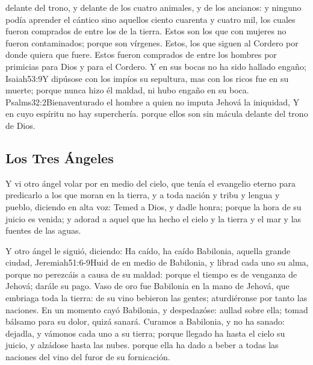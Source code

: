  delante del trono, y delante de los cuatro animales, y de los ancianos: y ninguno podía aprender el cántico sino aquellos ciento cuarenta y cuatro mil, los cuales fueron comprados de entre los de la tierra. 
Estos son los que con mujeres no fueron contaminados; porque son vírgenes. Estos, los que siguen al Cordero por donde quiera que fuere. Estos fueron comprados de entre los hombres por primicias para Dios y para el Cordero. 
Y en sus bocas no ha sido hallado engaño;%
				   {Isaiah}{53:9}{Y dipúsose con los impíos su sepultura, mas con los ricos fue en su muerte; porque nunca hizo él maldad, ni hubo engaño en su boca.}%
				   {Psalms}{32:2}{Bienaventurado el hombre a quien no imputa Jehová la iniquidad, Y en cuyo espíritu no hay superchería.}
 porque ellos son sin mácula delante del trono de Dios.
\subsection*{Los Tres Ángeles}
Y vi otro ángel volar por en medio del cielo, que tenía el evangelio eterno para predicarlo a los que moran en la tierra, y a toda nación y tribu y lengua y pueblo, 
diciendo en alta voz: Temed a Dios, y dadle honra; porque la hora de su juicio es venida; y adorad a aquel que ha hecho el cielo y la tierra y el mar y las fuentes de las aguas.

Y otro ángel le siguió, diciendo: Ha caído, ha caído Babilonia, aquella grande ciudad,%
				  {Jeremiah}{51:6-9}{Huid de en medio de Babilonia, y librad cada uno su alma, porque no perezcáis a causa de su maldad: porque el tiempo es de venganza de Jehová; darále su pago. Vaso de oro fue Babilonia en la mano de Jehová, que embriaga toda la tierra: de su vino bebieron las gentes; aturdiéronse por tanto las naciones. En un momento cayó Babilonia, y despedazóse: aullad sobre ella; tomad bálsamo para su dolor, quizá sanará. Curamos a Babilonia, y no ha sanado: dejadla, y vámonos cada uno a su tierra; porque llegado ha hasta el cielo su juicio, y alzádose hasta las nubes.}
 porque ella ha dado a beber a todas las naciones del vino del furor de su fornicación.

